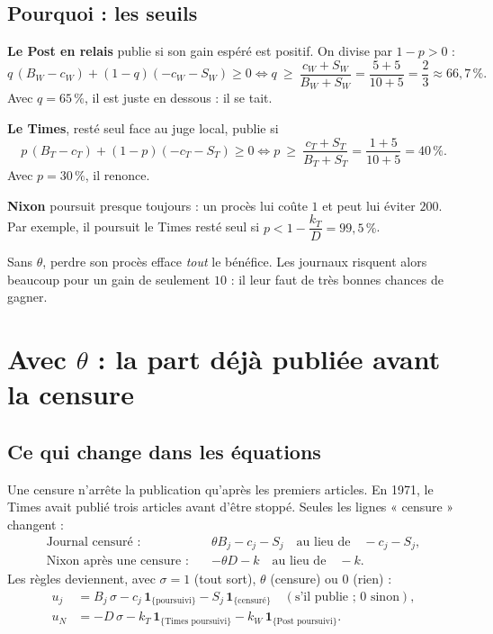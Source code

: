 \documentclass[11pt,a4paper]{article}
\theoremstyle{definition}
\newcommand{\ind}[1]{\mathbf{1}_{\{\text{#1}\}}}
\begin{document}
\subsection{Pourquoi : les seuils}
\textbf{Le Post en relais} publie si son gain espéré est positif. On divise par $1-p>0$ :
\[
q\,(B_W-c_W)+(1-q)(-c_W-S_W)\ge0\iff q\ \ge\ \frac{c_W+S_W}{B_W+S_W}=\frac{5+5}{10+5}=\frac23\approx66,7\,\%.
\]
Avec $q=65\,\%$, il est juste en dessous : il se tait.

\textbf{Le Times}, resté seul face au juge local, publie si
\[
p\,(B_T-c_T)+(1-p)(-c_T-S_T)\ge0\iff p\ \ge\ \frac{c_T+S_T}{B_T+S_T}=\frac{1+5}{10+5}=40\,\%.
\]
Avec $p=30\,\%$, il renonce.

\textbf{Nixon} poursuit presque toujours : un procès lui coûte $1$ et peut lui éviter $200$. Par exemple, il poursuit le Times resté seul si $p<1-\dfrac{k_T}{D}=99,5\,\%$.

\begin{simple}
Sans $\theta$, perdre son procès efface \emph{tout} le bénéfice. Les journaux risquent alors beaucoup pour un gain de seulement $10$ : il leur faut de très bonnes chances de gagner.
\end{simple}

\section{Avec \texorpdfstring{$\theta$}{theta} : la part déjà publiée avant la censure}

\subsection{Ce qui change dans les équations}
Une censure n'arrête la publication qu'après les premiers articles. En 1971, le Times avait publié trois articles avant d'être stoppé. Seules les lignes « censure » changent :
\begin{align*}
\text{Journal censuré :}\quad & \theta B_j-c_j-S_j \quad\text{au lieu de}\quad -c_j-S_j,\\
\text{Nixon après une censure :}\quad & -\theta D-k \quad\text{au lieu de}\quad -k .
\end{align*}
Les règles deviennent, avec $\sigma=1$ (tout sort), $\theta$ (censure) ou $0$ (rien) :
\begin{align*}
u_j &= B_j\,\sigma-c_j\,\ind{poursuivi}-S_j\,\ind{censuré}\quad(\text{s'il publie ; }0\text{ sinon}),\\
u_N &= -D\,\sigma-k_T\,\ind{Times poursuivi}-k_W\,\ind{Post poursuivi}.
\end{align*}
\end{document}
